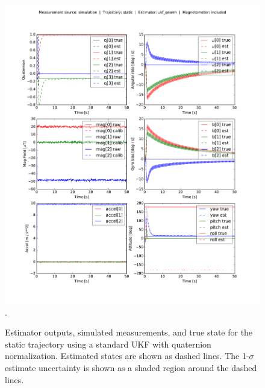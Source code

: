 \documentclass[conference]{IEEEtran}
\begin{document}
\begin{figure}[!t]
  \centering
  \includegraphics[width=7.5in]{figures/est_result_sim_static_ukf_qnorm_mag.pdf}
  \DeclareGraphicsExtensions.
  \caption{Estimator outputs, simulated measurements, and true state for the static trajectory using a standard UKF with quaternion normalization. Estimated states are shown as dashed lines. The 1-$\sigma$ estimate uncertainty is shown as a shaded region around the dashed lines.}
  \label{fig:est_result_sim_static_ukf_qnorm_mag}
\end{figure}
\end{document}
